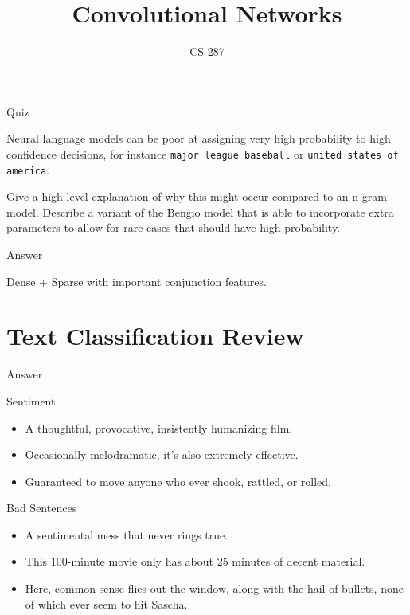 \documentclass{beamer}
\title{Convolutional Networks}
\date{}
\author{CS 287}
\begin{document}
\begin{frame}
  \titlepage
\end{frame}


\begin{frame}{Quiz}

Neural language models can be poor at assigning very high probability
to high confidence decisions, for instance \texttt{major league baseball}
or \texttt{united states of america}. 

\air 

Give a high-level explanation of why this might occur compared to an n-gram 
model. Describe a variant of the Bengio model that is able to incorporate extra parameters 
to allow for rare cases that should have high probability.  

\end{frame}

\begin{frame}{Answer}
  
 
  Dense + Sparse with important conjunction features. 

\end{frame}

\section{Text Classification Review}

\begin{frame}[allowframebreaks]{Answer}
\end{frame}

\begin{frame}{Sentiment}
  \begin{itemize}
  \item   A thoughtful, provocative, insistently humanizing film. 
  \item   Occasionally melodramatic, it's also extremely effective.
    \item   Guaranteed to move anyone who ever shook, rattled, or rolled.   
  \end{itemize}

  \alert{Bad Sentences}
  \begin{itemize}
  \item A sentimental mess that never rings true.  
  \item This 100-minute movie only has about 25 minutes of decent material.
  \item Here, common sense flies out the window, along with the hail of
    bullets, none of which ever seem to hit Sascha.
  \end{itemize}
\end{frame}
\end{document}
